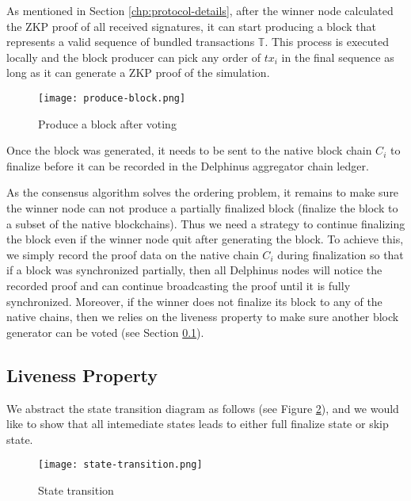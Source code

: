 As mentioned in Section \ref{chp:protocol-details}, after the winner node calculated the ZKP proof of all received signatures, it can start producing a block that represents a valid sequence of bundled transactions $\mathbb{T}$. This process is executed locally and the block producer can pick any order of $tx_i$ in the final sequence as long as it can generate a ZKP proof of the simulation.

\begin{figure}[!ht]
\begin{center}
\texttt{[image: produce-block.png]}
\end{center}
\caption{Produce a block after voting}
\label{produce-block}
\end{figure}

Once the block was generated, it needs to be sent to the native block chain $C_i$ to finalize before it can be recorded in the Delphinus aggregator chain ledger. 

As the consensus algorithm solves the ordering problem, it remains to make sure the winner node can not produce a partially finalized block (finalize the block to a subset of the native blockchains). Thus we need a strategy to continue finalizing the block even if the winner node quit after generating the block. To achieve this, we simply record the proof data on the native chain $C_i$ during finalization so that if a block was synchronized partially, then all Delphinus nodes will notice the recorded proof and can continue broadcasting the proof until it is fully synchronized. Moreover, if the winner does not finalize its block to any of the native chains, then we relies on the liveness property to make sure another block generator can be voted (see Section \ref{chp:sub:liveness}).

\subsection{Liveness Property}
\label{chp:sub:liveness}
We abstract the state transition diagram as follows (see Figure \ref{state-transition}), and we would like to show that all intemediate states leads to either full finalize state or skip state.
\begin{figure}[!ht]
\begin{center}
\texttt{[image: state-transition.png]}
\end{center}
\caption{State transition}
\label{state-transition}
\end{figure}

